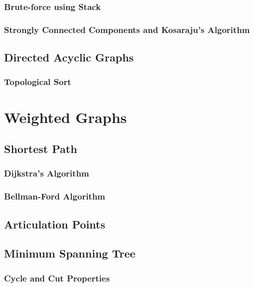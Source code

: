\documentclass{article}
\begin{document}
\subsubsection{Brute-force using Stack}

\subsubsection{Strongly Connected Components and Kosaraju's Algorithm}

\subsection{Directed Acyclic Graphs}

\subsubsection{Topological Sort}

\section{Weighted Graphs}

\subsection{Shortest Path}

\subsubsection{Dijkstra's Algorithm}

\subsubsection{Bellman-Ford Algorithm}

\subsection{Articulation Points}

\subsection{Minimum Spanning Tree}

\subsubsection{Cycle and Cut Properties}
\end{document}
